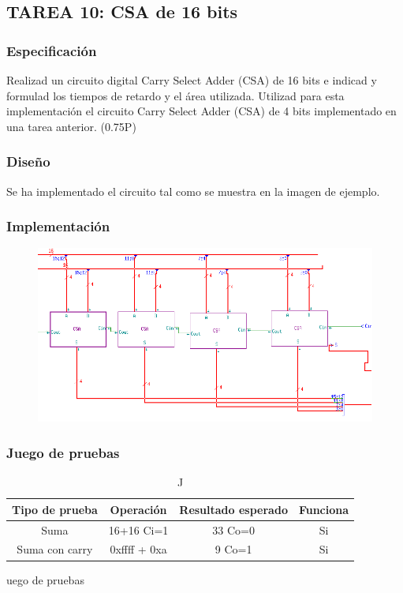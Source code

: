 \documentclass{article}
\begin{document}
	\subsection{TAREA 10: CSA de 16 bits}
		\subsubsection*{Especificación}
		Realizad un circuito digital Carry Select Adder (CSA) de 16 bits e indicad y formulad
		los tiempos de retardo y el área utilizada. Utilizad para esta implementación el circuito Carry Select
		Adder (CSA) de 4 bits implementado en una tarea anterior. (0.75P)


		\subsubsection*{Diseño}
		Se ha implementado el circuito tal como se muestra en la imagen de ejemplo.


		\subsubsection*{Implementación}
		 \begin{figure}[ht]
		 	\includegraphics[width=0.8\linewidth]{CSA16}
			\centering
		 \end{figure}


		\subsubsection*{Juego de pruebas}
		\begin{table}[h]
			\begin{center}
				\begin{tabular}{| c | c | c | c |}
					\hline
					Tipo de prueba & Operación & Resultado esperado & Funciona \\ \hline
					
					Suma & 16+16 Ci=1 & 33 Co=0 & Si \\ \hline
					Suma con carry & 0xffff + 0xa & 9 Co=1 & Si \\ \hline
				\end{tabular}
				\caption Juego de pruebas
			\end{center}
		\end{table}
\end{document}
